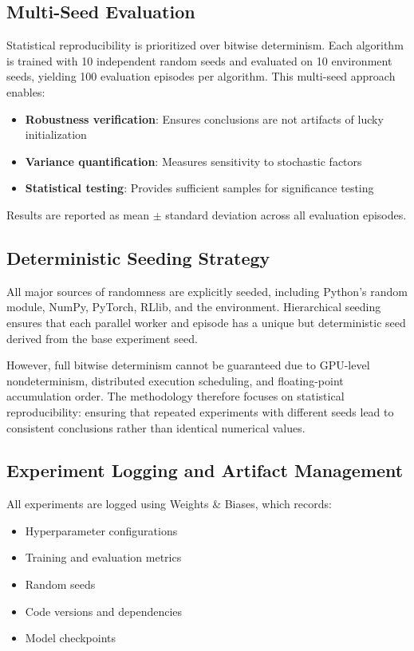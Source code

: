 \documentclass[english,bachelor]{hsluthesis}
\begin{document}
\subsection{Multi-Seed Evaluation}

Statistical reproducibility is prioritized over bitwise determinism. Each algorithm is trained with 10 independent random seeds and evaluated on 10 environment seeds, yielding 100 evaluation episodes per algorithm. This multi-seed approach enables:

\begin{itemize}
    \item \textbf{Robustness verification}: Ensures conclusions are not artifacts of lucky initialization
    \item \textbf{Variance quantification}: Measures sensitivity to stochastic factors
    \item \textbf{Statistical testing}: Provides sufficient samples for significance testing
\end{itemize}

Results are reported as mean $\pm$ standard deviation across all evaluation episodes.

\subsection{Deterministic Seeding Strategy}

All major sources of randomness are explicitly seeded, including Python's random module, NumPy, PyTorch, RLlib, and the environment. Hierarchical seeding ensures that each parallel worker and episode has a unique but deterministic seed derived from the base experiment seed.

However, full bitwise determinism cannot be guaranteed due to GPU-level nondeterminism, distributed execution scheduling, and floating-point accumulation order. The methodology therefore focuses on statistical reproducibility: ensuring that repeated experiments with different seeds lead to consistent conclusions rather than identical numerical values.

\subsection{Experiment Logging and Artifact Management}

All experiments are logged using Weights \& Biases, which records:

\begin{itemize}
    \item Hyperparameter configurations
    \item Training and evaluation metrics
    \item Random seeds
    \item Code versions and dependencies
    \item Model checkpoints
\end{itemize}
\end{document}
